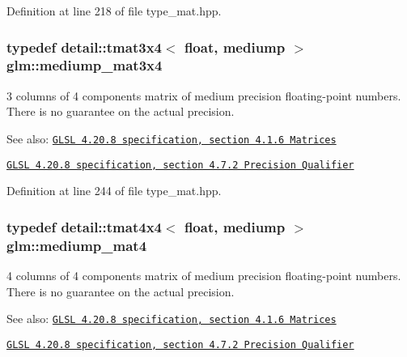Definition at line 218 of file type\_\-mat.hpp.\hypertarget{group__core__precision_g5654236019c6a732844da31534a3cf28}{
\subsubsection[mediump\_\-mat3x4]{\setlength{\rightskip}{0pt plus 5cm}typedef detail::tmat3x4$<$ float, mediump $>$ {\bf glm::mediump\_\-mat3x4}}}
\label{group__core__precision_g5654236019c6a732844da31534a3cf28}


3 columns of 4 components matrix of medium precision floating-point numbers. There is no guarantee on the actual precision.

\begin{Desc}
\item[See also:]\href{http://www.opengl.org/registry/doc/GLSLangSpec.4.20.8.pdf}{\tt GLSL 4.20.8 specification, section 4.1.6 Matrices} 

\href{http://www.opengl.org/registry/doc/GLSLangSpec.4.20.8.pdf}{\tt GLSL 4.20.8 specification, section 4.7.2 Precision Qualifier} \end{Desc}


Definition at line 244 of file type\_\-mat.hpp.\hypertarget{group__core__precision_gf3de9a0400cf707d3c159f32902b92db}{
\subsubsection[mediump\_\-mat4]{\setlength{\rightskip}{0pt plus 5cm}typedef detail::tmat4x4$<$ float, mediump $>$ {\bf glm::mediump\_\-mat4}}}
\label{group__core__precision_gf3de9a0400cf707d3c159f32902b92db}


4 columns of 4 components matrix of medium precision floating-point numbers. There is no guarantee on the actual precision.

\begin{Desc}
\item[See also:]\href{http://www.opengl.org/registry/doc/GLSLangSpec.4.20.8.pdf}{\tt GLSL 4.20.8 specification, section 4.1.6 Matrices} 

\href{http://www.opengl.org/registry/doc/GLSLangSpec.4.20.8.pdf}{\tt GLSL 4.20.8 specification, section 4.7.2 Precision Qualifier} \end{Desc}


